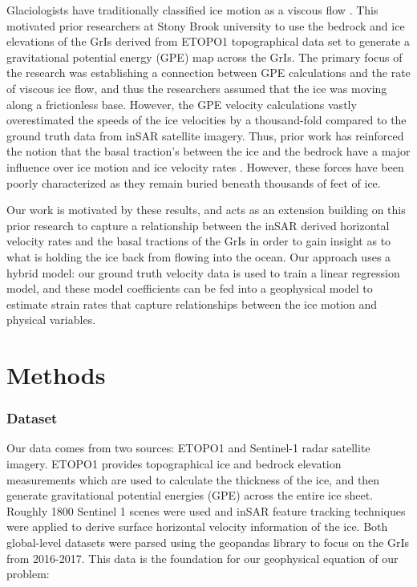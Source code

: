\documentclass{article}
\begin{document}
Glaciologists have traditionally classified ice motion as a viscous flow \cite{morland_steady_1980}. This motivated prior researchers at Stony Brook university to use the bedrock and ice elevations of the GrIs derived from ETOPO1 topographical data set to generate a gravitational potential energy (GPE) map across the GrIs. The primary focus of the research was establishing a connection between GPE calculations and the rate of viscous ice flow, and thus the researchers assumed that the ice was moving along a frictionless base. However, the GPE velocity calculations vastly overestimated the speeds of the ice velocities by a thousand-fold compared to the ground truth data from inSAR satellite imagery. Thus, prior work has reinforced the notion that the basal traction's between the ice and the bedrock have a major influence over ice motion and ice velocity rates \cite{}. However, these forces have been poorly characterized as they remain buried beneath thousands of feet of ice.

Our work is motivated by these results, and acts as an extension building on this prior research to capture a relationship between the inSAR derived horizontal velocity rates and the basal tractions of the GrIs in order to gain insight as to what is holding the ice back from flowing into the ocean. Our approach uses a hybrid model: our ground truth velocity data is used to train a linear regression model, and these model coefficients can be fed into a geophysical model to estimate strain rates that capture relationships between the ice motion and physical variables.

\section{Methods}

\subsubsection{Dataset}
Our data comes from two sources: ETOPO1 and Sentinel-1 radar satellite imagery. ETOPO1 provides topographical ice and bedrock elevation measurements which are used to calculate the thickness of the ice, and then generate gravitational potential energies (GPE) across the entire ice sheet. Roughly 1800 Sentinel 1 scenes were used and inSAR feature tracking techniques were applied to derive surface horizontal velocity information of the ice. Both global-level datasets were parsed using the geopandas library to focus on the GrIs from 2016-2017. This data is the foundation for our geophysical equation of our problem:
\end{document}
